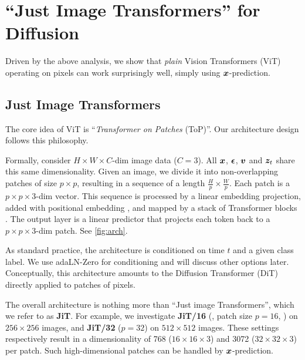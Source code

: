 

\newcommand{\exphl}[2]{%
  \tikz[baseline=(X.base)] \node[fill=#1, rounded corners=1pt, inner sep=3pt] (X)
  {$\displaystyle #2$};%
}

\newcommand{\hlbad}[1]{\exphl{bad}{#1}}
\newcommand{\hlgood}[1]{\exphl{good}{#1}}

\section{``Just Image Transformers'' for Diffusion}


Driven by the above analysis, we show that \textit{plain} Vision Transformers (ViT) \cite{Dosovitskiy2021} operating on pixels can work surprisingly well, simply using $\bm{x}$-prediction.

\subsection{Just Image Transformers}

The core idea of ViT \cite{Dosovitskiy2021} is ``\textit{Transformer on Patches} (ToP)''\footnotemark.
Our architecture design follows this philosophy.


Formally, consider $H{\times}W{\times}C$-dim image data ($C{=}3$). All $\bm{x}$, $\bm{\epsilon}$, $\bm{v}$ and $\bm{z}_t$ share this same dimensionality. 
Given an image, we divide it into non-overlapping patches of size $p{\times}p$, resulting in a sequence of a length $\frac{H}{p}{\times}\frac{W}{p}$. Each patch is a $p{\times}p{\times}3$-dim vector. This sequence is processed by a linear embedding projection, added with positional embedding \cite{vaswani2017attention}, and mapped by a stack of Transformer blocks \cite{vaswani2017attention}. 
The output layer is a linear predictor that projects each token back to a $p{\times}p{\times}3$-dim patch.
See \cref{fig:arch}.

As standard practice, the architecture is conditioned on time $t$ and a given class label. We use adaLN-Zero \cite{Peebles2023} for conditioning and will discuss other options later.
Conceptually, this architecture amounts to the Diffusion Transformer (DiT) \cite{Peebles2023} directly applied to patches of pixels.

The overall architecture is nothing more than ``Just image Transformers'', which we refer to as \textbf{JiT}. For example, we investigate \textbf{JiT/16} (\ie, patch size $p{=}16$, \cite{Dosovitskiy2021}) on $256{\times}256$ images, and \textbf{JiT/32} ($p{=}32$)  on $512{\times}512$ images. These settings respectively result in a dimensionality of 768 ($16{\times}16{\times}3$) and 3072 ($32{\times}32{\times}3$) per patch. 
Such high-dimensional patches can be handled by $\bm{x}$-prediction.

